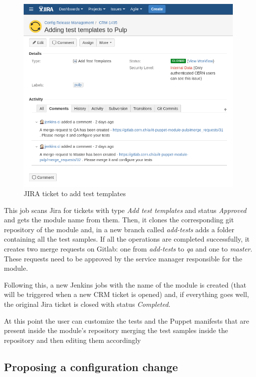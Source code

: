 \begin{figure}[H]
\includegraphics[width=\textwidth,height=\textheight,keepaspectratio]{ContinuousIntegrationWithJenkins/images/add_test_templates.jpg}
\caption{JIRA ticket to add test templates}
\end{figure}

This job scans Jira for tickets with type \textit{Add test templates} and
status \textit{Approved} and gets the module name from them. Then, it
clones the corresponding git repository of the module and, in a new branch
called \textit{add-tests} adds a folder containing all the test samples.
If all the operations are completed successfully, it creates two merge
requests on Gitlab: one from \textit{add-tests} to \textit{qa} and one to
\textit{master}. These requests need to be approved by the service manager
responsible for the module.

Following this, a new Jenkins jobs with the name of the module is created
(that will be triggered when a new CRM ticket is opened) and, if
everything goes well, the original Jira ticket is closed with status
\textit{Completed}.

At this point the user can customize the tests and the Puppet manifests
that are present inside the module's repository merging the test samples
inside the repository and then editing them accordingly 

\subsection{Proposing a configuration change}

